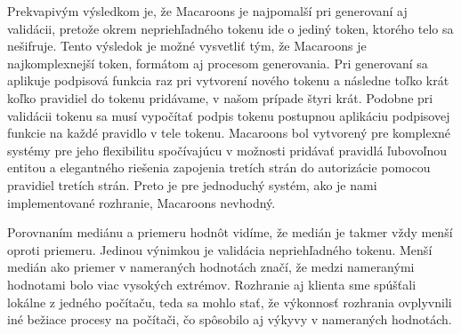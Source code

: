 Prekvapivým výsledkom je, že Macaroons je najpomalší pri generovaní aj validácii, pretože okrem nepriehľadného tokenu ide o jediný token, ktorého telo sa nešifruje. Tento výsledok je možné vysvetliť tým, že Macaroons je najkomplexnejší token, formátom aj procesom generovania. Pri generovaní sa aplikuje podpisová funkcia raz pri vytvorení nového tokenu a následne toľko krát koľko pravidiel do tokenu pridávame, v našom prípade štyri krát. Podobne pri validácii tokenu sa musí vypočítať podpis tokenu postupnou aplikáciu podpisovej funkcie na každé pravidlo v tele tokenu. Macaroons bol vytvorený pre komplexné systémy pre jeho flexibilitu spočívajúcu v možnosti pridávať pravidlá ľubovoľnou entitou a elegantného riešenia zapojenia tretích strán do autorizácie pomocou pravidiel tretích strán. Preto je pre jednoduchý systém, ako je nami implementované rozhranie, Macaroons nevhodný.

Porovnaním mediánu a priemeru hodnôt vidíme, že medián je takmer vždy menší oproti priemeru. Jedinou výnimkou je validácia nepriehľadného tokenu. Menší medián ako priemer v nameraných hodnotách značí, že medzi nameranými hodnotami bolo viac vysokých extrémov. Rozhranie aj klienta sme spúšťali lokálne z jedného počítaču, teda sa mohlo stať, že výkonnosť rozhrania ovplyvnili iné bežiace procesy na počítači, čo spôsobilo aj výkyvy v nameraných hodnotách.
